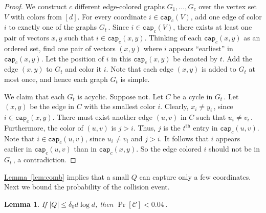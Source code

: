 \documentclass[11pt]{article}
\numberwithin{equation}{section}
\newtheorem{lemma}[theorem]{Lemma}
\theoremstyle{definition}
\theoremstyle{plain}
\newcommand{\expref}[2]{\hyperref[#2]{#1~\ref{#2}}}
\newcommand{\ord}[2][th]{\ensuremath{{#2}^{\mathrm{#1}}}}
\newcommand{\cC}{\ensuremath{\mathcal{C}}}
\newcommand{\lbconst}{\ensuremath{\delta_0}}
\newcommand{\capt}{\mathtt{cap}}
\newcommand{\Lem}[1]{\expref{Lemma}{lem:#1}}
\begin{document}
\begin{proof}
We construct $c$ different edge-colored graphs $G_1, \ldots, G_c$ over the vertex set $V$ with colors from $[d]$.
For every coordinate $i\in \capt_c(V)$, add one edge of color $i$ to exactly one of the graphs $G_t$\,. %
Since $i \in \capt_c(V)$, there exists at least one pair of
vectors $x,y$ such that $i \in \capt_c(x,y)$.
Thinking of each $\capt_c(x,y)$ as an ordered set, find one pair of vectors
$(x,y)$ where $i$ appears ``earliest'' in $\capt_c(x,y)$.
Let the position of $i$ in this $\capt_c(x,y)$ be denoted by $t$.
Add the edge $(x,y)$ to $G_t$ and color it $i$.
Note that each edge $(x,y)$ is added to $G_t$ at most once, and hence each graph $G_t$ is simple.

We claim that each $G_t$ is acyclic. Suppose not.
Let $C$ be a cycle in $G_t$\,. %
Let $(x,y)$ be the edge in $C$ with the smallest color $i$. 
Clearly, $x_i \neq y_i$\,, %
since $i \in \capt_c(x,y)$. There must exist another edge $(u,v)$ in $C$
such that $u_i \neq v_i$\,. %
Furthermore, the color of $(u,v)$
is $j > i$. Thus, $j$ is the $\ord{t}$ entry in $\capt_c(u,v)$.
Note that $i \in \capt_c(u,v)$,
since $u_i \neq v_i$ and $j > i$. It follows that $i$
appears earlier in $\capt_c(u,v)$ than in $\capt_c(x,y)$.
So the edge colored $i$ should not be in $G_t$\,, %
a contradiction.
\end{proof}

\Lem{comb} implies that a small $Q$ can capture only a few coordinates.
Next we bound the probability of the collision event.
%

\begin{lemma}\label{lem:collision}
If $|Q|\leq \lbconst d\log d$, then $\Pr[\cC] < 0.04$\,. %
%
\end{lemma}
\end{document}
